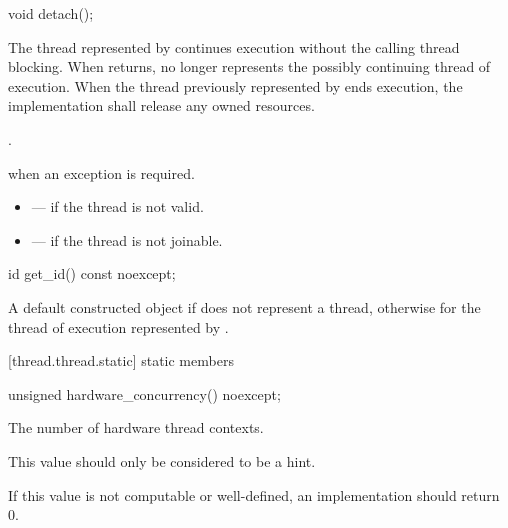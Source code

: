 %
\begin{itemdecl}
void detach();
\end{itemdecl}

\begin{itemdescr}
\pnum
\effects The thread represented by  continues execution without the calling thread
blocking. When  returns,  no longer represents the possibly continuing
thread of execution. When the thread previously represented by  ends execution, the
implementation shall release any owned resources.

\pnum\postconditions {}.

\pnum\throws {} when
an exception is required.

\pnum \errors
\begin{itemize}
\item {} --- if the thread is not valid.
\item {} --- if the thread is not joinable.
\end{itemize}
\end{itemdescr}

%
\begin{itemdecl}
id get_id() const noexcept;
\end{itemdecl}

\begin{itemdescr}
\pnum
\returns A default constructed  object if  does not represent a thread,
otherwise  for the thread of execution represented by
.
\end{itemdescr}

[thread.thread.static]{ static members}

%
\begin{itemdecl}
unsigned hardware_concurrency() noexcept;
\end{itemdecl}

\begin{itemdescr}
\pnum
\returns The number of hardware thread contexts. \begin{note} This value should
only be considered to be a hint. \end{note} If this value is not computable or
well-defined, an implementation should return 0.
\end{itemdescr}

